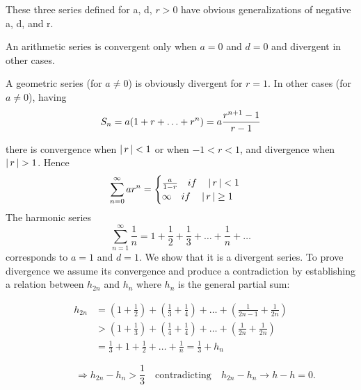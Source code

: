 \documentclass[11pt]{amsbook}
\begin{document}


\noindent These three series defined for a, d, $r>0$ have obvious generalizations of negative a, d, and r.\newline


An arithmetic series is convergent only when $a=0$ and $d=0$ and divergent in other cases. \newline

A geometric series (for $a\neq0$) is obviously divergent for $r=1$. In other cases (for $a\neq0$), having \newline
\[
S_{n} = a(1 + r + \dotso + r^{n}) = a  \frac{r^{n+1} - 1}{r - 1} \\
\]

\noindent there is convergence when $\left \lvert \, r \, \right \rvert<1$ or when $ -1 < r<1$, and divergence when $\left \lvert \, r \, \right \rvert>1$. Hence \\
\[
\sum_{n=0}^{\infty} a r^{n} = 
\begin{cases}
 \frac{a}{1-r} \quad if \quad \left \lvert \, r \, \right \rvert<1 \\
 \infty  \quad if \quad \left \lvert \, r \, \right \rvert \geq 1
\end{cases} \\
\]
\newline
The harmonic series \\
\[
\sum_{n=1}^{\infty} \frac{1}{n} = 1 + \frac{1}{2} + \frac{1}{3} + \dotso + \frac{1}{n} + \dotso
\]
\newline
\noindent corresponds to $a=1$ and $d=1$. We show that it is a divergent series. To prove divergence we assume
its convergence and produce a contradiction by establishing a relation between $h_{2n}$
and  $h_{n}$ where $h_{n}$ is the general partial sum:



\begin{align*}
h_{2n}
& = ( 1+\frac{1}{2} )+( \frac{1}{3}+\frac{1}{4})+\dotso+(\frac{1}{2n-1}+ \frac{1}{2n}) \\
&> ( 1+\frac{1}{3} )+( \frac{1}{4}+\frac{1}{4})+\dotso+(\frac{1}{2n} +\frac{1}{2n}) \\
& = \frac{1}{3}+1+ \frac{1}{2} + \dotso+\frac{1}{n} =\frac{1}{3}+h_{n} 
\end{align*}

\[
 \qquad \quad \Longrightarrow h_{2n}-h_{n} > \frac{1}{3} \quad 
 \text{contradicting} \quad h_{2n}-h_{n} \rightarrow h-h = 0.
\]
\end{document}
